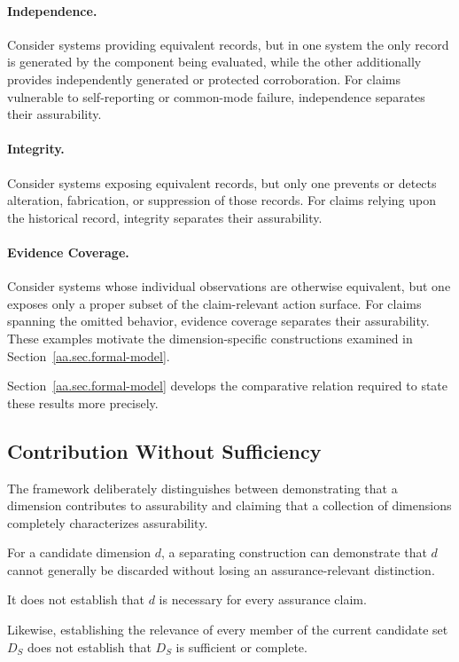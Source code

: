 \paragraph{Independence.}
Consider systems providing equivalent records, but in one system
the only record is generated by the component being evaluated,
while the other additionally provides independently generated
or protected corroboration.
For claims vulnerable to self-reporting or common-mode failure,
independence separates their assurability.

\paragraph{Integrity.}
Consider systems exposing equivalent records, but only one
prevents or detects alteration, fabrication, or suppression
of those records.
For claims relying upon the historical record, integrity
separates their assurability.

\paragraph{Evidence Coverage.}
Consider systems whose individual observations are otherwise
equivalent, but one exposes only a proper subset of the
claim-relevant action surface.
For claims spanning the omitted behavior, evidence coverage
separates their assurability.
These examples motivate the dimension-specific constructions
examined in Section~\ref{aa.sec.formal-model}.

Section~\ref{aa.sec.formal-model} develops the comparative relation
required to state these results more precisely.

\subsection{Contribution Without Sufficiency}
\label{aa.subsec.necessity-sufficiency}

The framework deliberately distinguishes between demonstrating
that a dimension contributes to assurability and claiming that
a collection of dimensions completely characterizes assurability.

For a candidate dimension \(d\), a separating construction can
demonstrate that \(d\) cannot generally be discarded without
losing an assurance-relevant distinction.

It does not establish that \(d\) is necessary for every assurance claim.

Likewise, establishing the relevance of every member of the current
candidate set \(D_S\) does not establish that \(D_S\) is sufficient
or complete.

